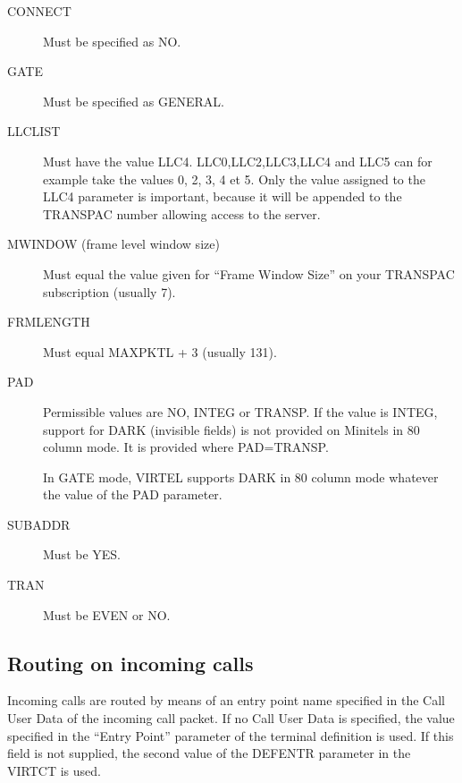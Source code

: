 \documentclass[letterpaper,10pt,english]{sphinxmanual}
\begin{document}
\begin{description}
\item[{CONNECT}] \leavevmode
Must be specified as NO.

\item[{GATE}] \leavevmode
Must be specified as GENERAL.

\item[{LLCLIST}] \leavevmode
Must have the value LLC4. LLC0,LLC2,LLC3,LLC4 and LLC5 can for example take the values 0, 2, 3, 4 et 5. Only the value assigned to the LLC4 parameter is important, because it will be appended to the TRANSPAC number allowing access to the server.

\item[{MWINDOW (frame level window size)}] \leavevmode
Must equal the value given for “Frame Window Size” on your TRANSPAC subscription (usually 7).

\item[{FRMLENGTH}] \leavevmode
Must equal MAXPKTL + 3 (usually 131).

\item[{PAD}] \leavevmode
Permissible values are NO, INTEG or TRANSP. If the value is INTEG, support for DARK (invisible fields) is not provided on Minitels in
80 column mode. It is provided where PAD=TRANSP.

In GATE mode, VIRTEL supports DARK in 80 column mode whatever the value of the PAD parameter.

\item[{SUBADDR}] \leavevmode
Must be YES.

\item[{TRAN}] \leavevmode
Must be EVEN or NO.

\end{description}


\subsection{Routing on incoming calls}
\label{\detokenize{connectivity_guide:index-67}}\label{\detokenize{connectivity_guide:routing-on-incoming-calls}}
Incoming calls are routed by means of an entry point name specified in the Call User Data of the incoming call packet. If no Call User Data is specified, the value specified in the “Entry Point” parameter of the terminal definition is used. If this field is not supplied, the second value of the DEFENTR parameter in the VIRTCT is used.
\end{document}
